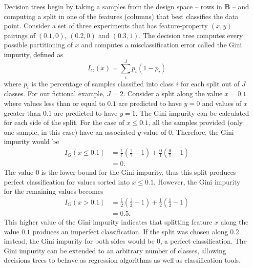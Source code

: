 Decision trees begin by taking a samples from the design space -- rows in $\mathbf{B}$ -- and computing a split in one of the features (columns) that best classifies the data point. Consider a set of three experiments that has feature-property $\left(x,y\right)$ pairings of $\left(0.1, 0\right)$, $\left(0.2,0\right)$ and $\left(0.3,1\right)$. The decision tree computes every possible partitioning of $x$ and computes a misclassification error called the Gini impurity, defined as 
\begin{equation}
	I_G(x) = \sum_i^J p_i\left(1-p_i\right)
\label{gini}
\end{equation}
where $p_i$ is the percentage of samples classified into class $i$ for each split out of $J$ classes. For our fictional example, $J = 2$.  Consider a split along the value $x = 0.1$ where values less than or equal to $0.1$ are predicted to have $y=0$ and values of $x$ greater than $0.1$ are predicted to have $y=1$. The Gini impurity can be calculated for each side of the split. For the case of $x\leq0.1$, all the samples provided (only one sample, in this case) have an associated $y$ value of $0$. Therefore, the Gini impurity would be 
\begin{equation}
	\begin{split}
	I_G\left(x \leq 0.1\right) & = \frac{1}{1}\left(\frac{1}{1} - 1\right) + \frac{0}{1}\left(\frac{0}{1} - 1\right) \\
		& = 0.
	\end{split}
\end{equation}
The value $0$ is the lower bound for the Gini impurity, thus this split produces perfect classification for values sorted into $x \leq 0.1$. However, the Gini impurity for the remaining values becomes 
\begin{equation}
	\begin{split}
		I_G\left(x > 0.1\right) & = \frac{1}{2}\left(\frac{1}{2} - 1\right) + \frac{1}{2}\left(\frac{1}{2} - 1\right) \\
		& = 0.5.
	\end{split}
\end{equation}
This higher value of the Gini impurity indicates that splitting feature $x$ along the value $0.1$ produces an imperfect classification. If the split was chosen along $0.2$ instead, the Gini impurity for both sides would be $0$, a perfect classification. The Gini impurity can be extended to an arbitrary number of classes, allowing decisions trees to behave as regression algorithms as well as classification tools.

